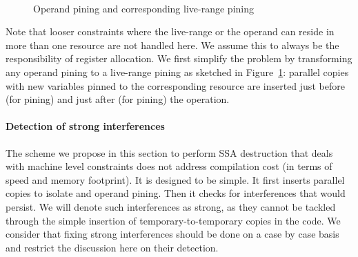 \begin{figure}[h]
\hfill
{}
\\
\hfill
{}
\caption{\label{fig:alternative_ssa_destruction:pining}Operand pining and corresponding live-range pining}
\end{figure}

Note that looser constraints where the live-range or the operand can reside in more than one resource are not handled here. 
We assume this to always be the responsibility of register allocation. 
We first simplify the problem by transforming any operand pining to a live-range pining as sketched in Figure~\ref{fig:alternative_ssa_destruction:pining}: 
parallel copies with new variables pinned to the corresponding resource are inserted just before (for \useop pining) and just after (for  pining) the operation.




\paragraph{Detection of strong interferences}
\label{par:alternative_ssa_destruction:strong}
The scheme we propose in this section to perform SSA destruction that deals with machine level constraints does not address compilation cost (in terms of speed and memory footprint). 
It is designed to be simple. 
It first inserts parallel copies to isolate \phifuns and operand pining. 
Then it checks for interferences that would persist. 
We will denote such interferences as strong, as they cannot be tackled through the simple insertion of temporary-to-temporary copies in the code. 
We consider that fixing strong interferences should be done on a case by case basis and restrict the discussion here on their detection.

